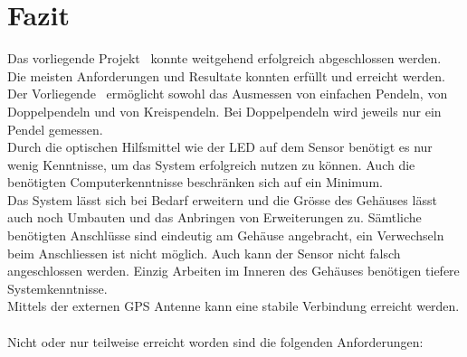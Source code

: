 \section{Fazit}
Das vorliegende Projekt \documenttitle\ konnte weitgehend erfolgreich abgeschlossen werden. Die meisten Anforderungen und Resultate konnten erfüllt und erreicht werden. 
Der Vorliegende \documenttitle\ ermöglicht sowohl das Ausmessen von einfachen Pendeln, von Doppelpendeln und von Kreispendeln. Bei Doppelpendeln wird jeweils nur ein Pendel gemessen.\\
Durch die optischen Hilfsmittel wie der LED auf dem Sensor benötigt es nur wenig Kenntnisse, um das System erfolgreich nutzen zu können. Auch die benötigten Computerkenntnisse beschränken sich auf ein Minimum.\\
Das System lässt sich bei Bedarf erweitern und die Grösse des Gehäuses lässt auch noch Umbauten und das Anbringen von Erweiterungen zu. Sämtliche benötigten Anschlüsse sind eindeutig am Gehäuse angebracht, ein Verwechseln beim Anschliessen ist nicht möglich. Auch kann der Sensor nicht falsch angeschlossen werden. Einzig Arbeiten im Inneren des Gehäuses benötigen tiefere Systemkenntnisse.\\
Mittels der externen GPS Antenne kann eine stabile Verbindung erreicht werden.\\
\\
Nicht oder nur teilweise erreicht worden sind die folgenden Anforderungen:
